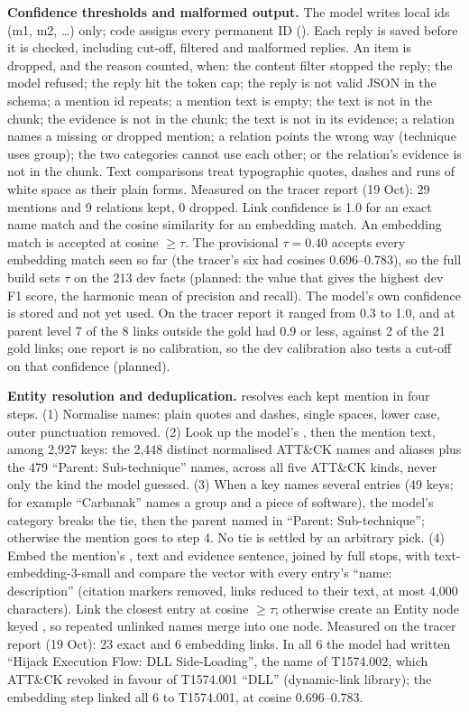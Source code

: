 \documentclass[10pt]{article}
\begin{document}
\textbf{Confidence thresholds and malformed output.} The model writes local ids (m1, m2, \ldots) only; code assigns every permanent ID (). Each reply is saved before it is checked, including cut-off, filtered and malformed replies. An item is dropped, and the reason counted, when: the content filter stopped the reply; the model refused; the reply hit the token cap; the reply is not valid JSON in the schema; a mention id repeats; a mention text is empty; the text is not in the chunk; the evidence is not in the chunk; the text is not in its evidence; a relation names a missing or dropped mention; a relation points the wrong way (technique uses group); the two categories cannot use each other; or the relation's evidence is not in the chunk. Text comparisons treat typographic quotes, dashes and runs of white space as their plain forms. Measured on the tracer report (19 Oct): 29 mentions and 9 relations kept, 0 dropped. Link confidence is 1.0 for an exact name match and the cosine similarity for an embedding match. An embedding match is accepted at cosine $\ge \tau$. The provisional $\tau = 0.40$ accepts every embedding match seen so far (the tracer's six had cosines 0.696--0.783), so the full build sets $\tau$ on the 213 dev facts (planned: the value that gives the highest dev F1 score, the harmonic mean of precision and recall). The model's own confidence is stored and not yet used. On the tracer report it ranged from 0.3 to 1.0, and at parent level 7 of the 8 links outside the gold had 0.9 or less, against 2 of the 21 gold links; one report is no calibration, so the dev calibration also tests a cut-off on that confidence (planned).

\textbf{Entity resolution and deduplication.}  resolves each kept mention in four steps.
(1) Normalise names: plain quotes and dashes, single spaces, lower case, outer punctuation removed.
(2) Look up the model's , then the mention text, among 2,927 keys: the 2,448 distinct normalised ATT\&CK names and aliases plus the 479 ``Parent: Sub-technique'' names, across all five ATT\&CK kinds, never only the kind the model guessed.
(3) When a key names several entries (49 keys; for example ``Carbanak'' names a group and a piece of software), the model's category breaks the tie, then the parent named in ``Parent: Sub-technique''; otherwise the mention goes to step 4. No tie is settled by an arbitrary pick.
(4) Embed the mention's , text and evidence sentence, joined by full stops, with text-embedding-3-small and compare the vector with every entry's ``name: description'' (citation markers removed, links reduced to their text, at most 4,000 characters). Link the closest entry at cosine $\ge \tau$; otherwise create an Entity node keyed , so repeated unlinked names merge into one node. Measured on the tracer report (19 Oct): 23 exact and 6 embedding links. In all 6 the model had written ``Hijack Execution Flow: DLL Side-Loading'', the name of T1574.002, which ATT\&CK revoked in favour of T1574.001 ``DLL'' (dynamic-link library); the embedding step linked all 6 to T1574.001, at cosine 0.696--0.783.
\end{document}
